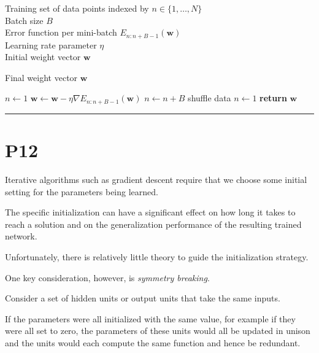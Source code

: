 \documentclass{article}
\begin{document}
\begin{algorithm}
\caption{Mini-batch stochastic gradient descent}
\begin{algorithmic}
\Input
  \begin{minipage}[t]{0.82\linewidth}
    Training set of data points indexed by $n \in \{1,\dots,N\}$\\
    Batch size $B$\\
    Error function per mini-batch $E_{n:n+B-1}(\mathbf{w})$\\
    Learning rate parameter $\eta$\\
    Initial weight vector $\mathbf{w}$
  \end{minipage}
\Output Final weight vector $\mathbf{w}$

\State $n \leftarrow 1$
\Repeat
  \State $\mathbf{w} \leftarrow \mathbf{w} - \eta \nabla E_{n:n+B-1}(\mathbf{w})$ 
  \State $n \leftarrow n + B$ %
    \State shuffle data 
    \State $n \gets 1$
  \EndIf
{}
\State \textbf{return} $\mathbf{w}$
\end{algorithmic}
\end{algorithm}

\noindent\rule{\linewidth}{0.4pt}

\section{P12}%

Iterative algorithms such as gradient descent require that we choose some initial setting for the parameters being learned. 

The specific initialization can have a significant effect on how long it takes to reach a solution and on the generalization performance of the resulting trained network. 

Unfortunately, there is relatively little theory to guide the initialization strategy.

One key consideration, however, is \emph{symmetry breaking}. 

Consider a set of hidden units or output units that take the same inputs. 

If the parameters were all initialized with the same value, for example if they were all set to zero, the parameters of these units would all be updated in unison and the units would each compute the same function and hence be redundant. 
\end{document}
